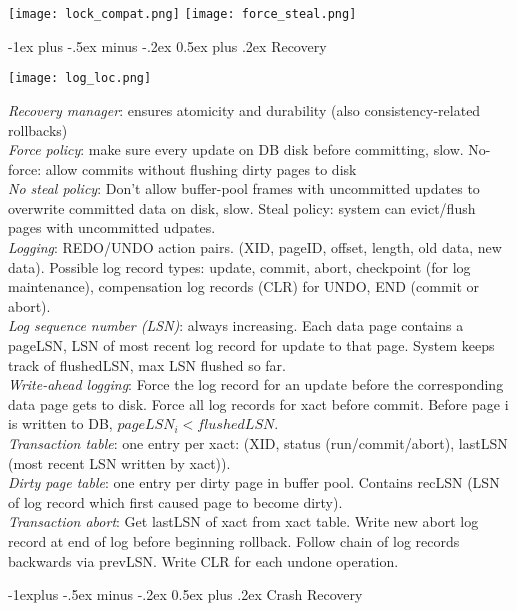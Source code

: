 \documentclass[10pt,landscape]{article}
\makeatletter
\renewcommand{\section}{\@startsection{section}{1}{0mm}%
                                {-1ex plus -.5ex minus -.2ex}%
                                {0.5ex plus .2ex}%
                                {\normalfont\large\bfseries}}
\renewcommand{\subsection}{\@startsection{subsection}{2}{0mm}%
                                {-1explus -.5ex minus -.2ex}%
                                {0.5ex plus .2ex}%
                                {\normalfont\normalsize\bfseries}}
\makeatother
\begin{document}
\begin{multicols}{3}
\texttt{[image: lock\_compat.png]} \hfill \texttt{[image: force\_steal.png]}


\section{Recovery}

\centerline{\texttt{[image: log\_loc.png]}}

\textit{Recovery manager}: ensures atomicity and durability (also consistency-related rollbacks) \\
\textit{Force policy}: make sure every update on DB disk before committing, slow. No-force: allow commits without flushing dirty pages to disk \\
\textit{No steal policy}: Don't allow buffer-pool frames with uncommitted updates to overwrite committed data on disk, slow. Steal policy: system can evict/flush pages with uncommitted udpates. \\
\textit{Logging}: REDO/UNDO action pairs. (XID, pageID, offset, length, old data, new data). Possible log record types: update, commit, abort, checkpoint (for log maintenance), compensation log records (CLR) for UNDO, END (commit or abort). \\
\textit{Log sequence number (LSN)}: always increasing. Each data page contains a pageLSN, LSN of most recent log record for update to that page. System keeps track of flushedLSN, max LSN flushed so far. \\
\textit{Write-ahead logging}: Force the log record for an update before the corresponding data page gets to disk. Force all log records for xact before commit. Before page i is written to DB, $pageLSN_i < flushedLSN$. \\
\textit{Transaction table}: one entry per xact: (XID, status (run/commit/abort), lastLSN (most recent LSN written by xact)). \\
\textit{Dirty page table}: one entry per dirty page in buffer pool. Contains recLSN (LSN of log record which first caused page to become dirty). \\
\textit{Transaction abort}: Get lastLSN of xact from xact table. Write new abort log record at end of log before beginning rollback. Follow chain of log records backwards via prevLSN. Write CLR for each undone operation.

\subsection{Crash Recovery}


\end{multicols}
\end{document}
